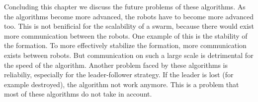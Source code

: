   \begin{table}[H]
  \renewcommand{\arraystretch}{1.3}
  \label{table_alg_formation}
  \caption{Overview of Collective Transport Algorithms}
  \centering
{}
  \end{table}

Concluding this chapter we discuss the future problems of these algorithms. 
As the algorithms become more advanced, the robots have to become more advanced too.
This is not benificial for the scalability of a swarm, because there would exist more communication between the robots. 
One example of this is the stability of the formation. 
To more effectively stabilize the formation, more communication exists between robots. 
But communication on such a large scale is detrimental for the speed of the algorithm. 
Another problem faced by these algorithms is reliabiliy, especially for the leader-follower strategy. 
If the leader is lost (for example destroyed), the algorithm   not work anymore. 
This is a problem that most of these algorithms do not take in account.  
